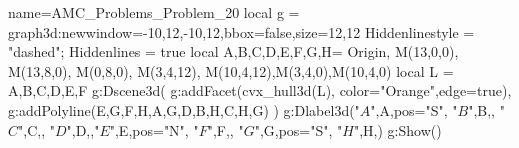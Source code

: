 \documentclass[border=2 mm]{standalone}
\begin{document}
\begin{luadraw}{name=AMC_Problems_Problem_20}
local g = graph3d:new{window={-10,12,-10,12},bbox=false,size={12,12}}
Hiddenlinestyle = "dashed"; Hiddenlines = true
local A,B,C,D,E,F,G,H= Origin, M(13,0,0),  M(13,8,0), M(0,8,0), M(3,4,12), M(10,4,12),M(3,4,0),M(10,4,0)
local L = {A,B,C,D,E,F}
g:Dscene3d(
    g:addFacet(cvx_hull3d(L), {color="Orange",edge=true}),
    g:addPolyline({{E,G},{F,H},{A,G,D},{B,H,C},{H,G}})
    )
g:Dlabel3d("$A$",A,{pos="S"}, "$B$",B,{}, "$C$",C,{}, "$D$",D,{},"$E$",E,{pos="N"}, "$F$",F,{}, "$G$",G,{pos="S"}, "$H$",H,{})
g:Show()
\end{luadraw}
\end{document}
